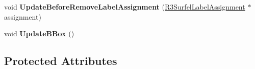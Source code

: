 \begin{DoxyCompactItemize}
\item 
void {\bfseries Update\+Before\+Remove\+Label\+Assignment} (\hyperlink{class_r3_surfel_label_assignment}{R3\+Surfel\+Label\+Assignment} $\ast$assignment)\hypertarget{class_r3_surfel_object_ade01b587dff4e5a409e054906bc6bc28}{}\label{class_r3_surfel_object_ade01b587dff4e5a409e054906bc6bc28}

\item 
void {\bfseries Update\+B\+Box} ()\hypertarget{class_r3_surfel_object_a5b0830924083aac6e6a5a947ce6b9868}{}\label{class_r3_surfel_object_a5b0830924083aac6e6a5a947ce6b9868}

\end{DoxyCompactItemize}
\subsection*{Protected Attributes}
